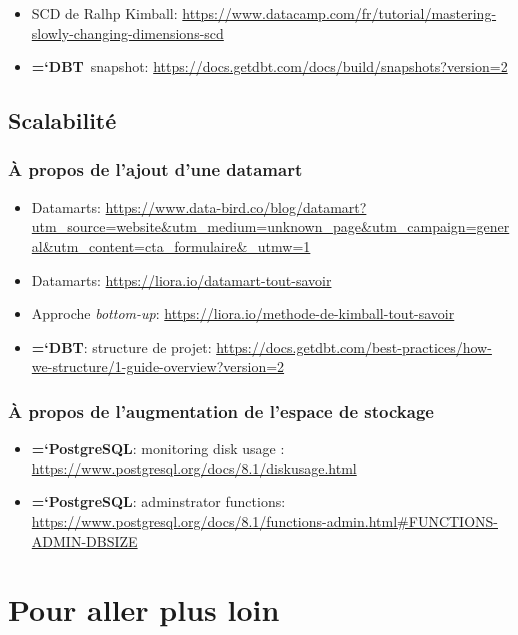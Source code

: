 \documentclass[11pt]{article}
\renewcommand{\emph}[1]{\textsl{#1}}
\newcommand{\techno}[1]{{\ttfamily\bfseries\hyphenchar\font=`\-\color{Sienna}#1}}
\newcommand{\postgresql}{\techno{PostgreSQL}}
\newcommand{\dbt}{\techno{DBT}}
\begin{document}
\begin{itemize}
    \item SCD de Ralhp Kimball: \url{https://www.datacamp.com/fr/tutorial/mastering-slowly-changing-dimensions-scd}
    \item \dbt\ snapshot: \url{https://docs.getdbt.com/docs/build/snapshots?version=2}
\end{itemize}

\subsection{Scalabilité}

\subsubsection{À propos de l'ajout d'une datamart} \label{ann:ajout_dm_liens_utiles}

\begin{itemize}
    \item Datamarts: \url{https://www.data-bird.co/blog/datamart?utm_source=website&utm_medium=unknown_page&utm_campaign=general&utm_content=cta_formulaire&_utmw=1}
    \item Datamarts: \url{https://liora.io/datamart-tout-savoir}
    \item Approche \emph{bottom-up}: \url{https://liora.io/methode-de-kimball-tout-savoir}
    \item \dbt: structure de projet: \url{https://docs.getdbt.com/best-practices/how-we-structure/1-guide-overview?version=2}
\end{itemize}

\subsubsection*{À propos de l'augmentation de l'espace de stockage} \label{ann:augmentation_disque_liens_utiles}
\begin{itemize}
    \item \postgresql : monitoring disk usage : \url{https://www.postgresql.org/docs/8.1/diskusage.html}
    \item \postgresql : adminstrator functions: \url{https://www.postgresql.org/docs/8.1/functions-admin.html#FUNCTIONS-ADMIN-DBSIZE}
\end{itemize}



\pagebreak
\section{Pour aller plus loin}
\end{document}
